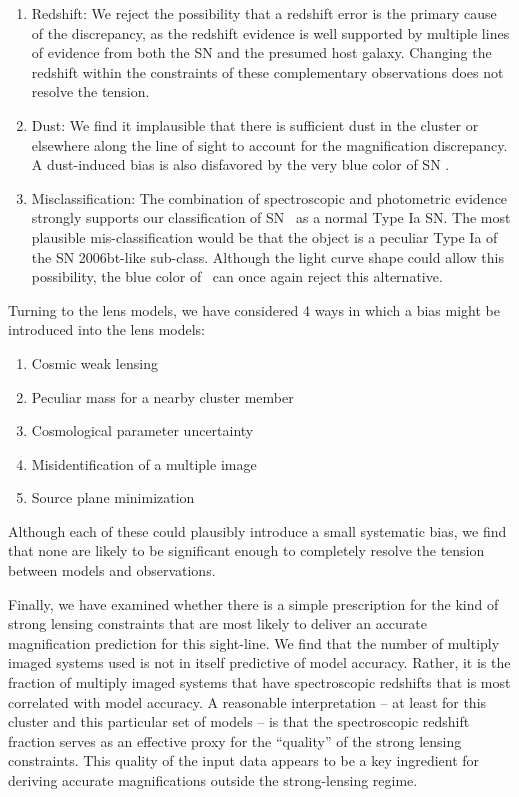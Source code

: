 \begin{enumerate}
\item Redshift: We reject the possibility that a redshift error is the primary cause
of the discrepancy, as the redshift evidence is well supported by
multiple lines of evidence from both the SN and the presumed host
galaxy. Changing the redshift within the constraints of these
complementary observations does not resolve the tension. 
\item Dust: We find
it implausible that there is sufficient dust in the cluster or
elsewhere along the line of sight to account for the magnification
discrepancy.  A dust-induced bias is also disfavored by the very blue
color of SN \tomas.
\item Misclassification: The combination of spectroscopic and
photometric evidence strongly supports our classification of
SN \tomas\ as a normal Type Ia SN.  The most plausible
mis-classification would be that the object is a peculiar Type Ia of
the SN 2006bt-like sub-class.  Although the light curve shape could
allow this possibility, the blue color of \tomas\ can once again
reject this alternative. 
\end{enumerate}

\noindent 

Turning to the lens models, we have considered 4 ways in which a bias
might be introduced into the lens models:

\begin{enumerate}
\item Cosmic weak lensing 
\item Peculiar mass for a nearby cluster member
\item Cosmological parameter uncertainty
\item Misidentification of a multiple image
\item Source plane minimization
\end{enumerate}

\noindent
Although each of these could plausibly introduce a small systematic
bias, we find that none are likely to be significant enough  to completely resolve the tension between models and
observations.  

Finally, we have examined whether there is a simple prescription for
the kind of strong lensing constraints that are most likely to deliver
an accurate magnification prediction for this sight-line. 
 We find
that the number of multiply imaged systems used is not in itself
predictive of model accuracy.  Rather, it is the fraction of multiply
imaged systems that have spectroscopic redshifts that is most
correlated with model accuracy.  A reasonable interpretation 
-- at least for this cluster and this particular set of models -- is
that the spectroscopic redshift fraction serves as an effective proxy
for the ``quality'' of the strong lensing constraints. This quality of
the input data appears to be a key ingredient for deriving accurate
magnifications outside the strong-lensing regime. 

